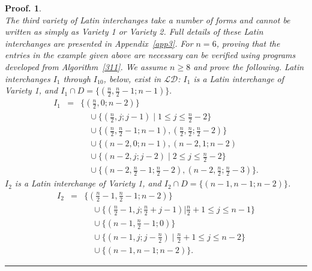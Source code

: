 \documentclass[12pt]{report}
\newtheorem{preproof}{{\bf Proof.}}
\newenvironment{proof}[1]{\begin{preproof}{\rm
               #1}\hfill{\rule[-0.5mm]{2mm}{2mm}}}{\end{preproof}}
\begin{document}
\begin{proof}
{ \\
The third variety of Latin interchanges take a number of forms and cannot be
written as simply as Variety 1 or Variety 2.  Full details of
these Latin interchanges are presented in Appendix~\ref{app3}.
\newline
\vskip 2mm 
\noindent For $n = 6$, proving that the entries in the example given above
are necessary can be verified using programs developed from Algorithm~\ref{311}.
We assume $n \geq 8$ and prove the following.
Latin interchanges $I_{1}$ through $I_{10}$, below, exist in $\mathcal{LD}$: 
\newline
\vskip 2mm
\noindent $I_{1}$ is a Latin interchange of Variety 1, and $I_{1} \cap D = \{ ( \displaystyle{\frac{n}{2}}, \displaystyle{\frac{n}{2}} - 1; n - 1) \}.$
\begin{eqnarray*}
I_{1} &= & \{ (\displaystyle{\frac{n}{2}}, 0; n - 2) \} \\
&& \quad{}\cup \{ (\displaystyle{\frac{n}{2}}, j; j-1) \mid 1 \leq j \leq \displaystyle{\frac{n}{2}} - 2 \} \\
&& \quad{}\cup \{ ( \displaystyle{\frac{n}{2}}, \displaystyle{\frac{n}{2}} - 1; n - 1 ), ( \displaystyle{\frac{n}{2}}, \displaystyle{\frac{n}{2}}; \displaystyle{\frac{n}{2}} - 2) \} \\
&& \quad{}\cup \{ (n - 2, 0; n - 1), (n - 2, 1; n - 2) \\ 
&& \quad{}\cup \{ ( n - 2, j; j - 2 ) \mid 2 \leq j \leq \displaystyle{\frac{n}{2}} - 2 \} \\
&& \quad{}\cup \{ ( n - 2, \displaystyle{\frac{n}{2}} - 1; \displaystyle{\frac{n}{2}} - 2 ), ( n - 2, \displaystyle{\frac{n}{2}};  \displaystyle{\frac{n}{2}}- 3) \}.
\end{eqnarray*}
\noindent $I_{2}$ is a Latin interchange of Variety 1, and $I_{2} \cap D = \{ (n - 1, n - 1; n - 2) \}$.
\begin{eqnarray*}
I_{2} & = & \{ ( \displaystyle{\frac{n}{2}} - 1, \displaystyle{\frac{n}{2}} - 1; n - 2 )  \} \\ 
&& \quad{}\cup \{ (\displaystyle{\frac{n}{2}} - 1, j; \displaystyle{\frac{n}{2}} + j - 1) | \displaystyle{\frac{n}{2}} + 1 \leq j \leq n - 1 \} \\ 
&& \quad{}\cup \{ ( n - 1, \displaystyle{\frac{n}{2}} - 1; 0 ) \} \\
&& \quad{}\cup \{ ( n - 1, j; j - \displaystyle{\frac{n}{2}} ) \mid \displaystyle{\frac{n}{2}} + 1 \leq j \leq n - 2 \} \\ 
&& \quad{}\cup \{ ( n - 1, n - 1; n - 2 ) \}.
\end{eqnarray*}

}
\end{proof}
\end{document}
